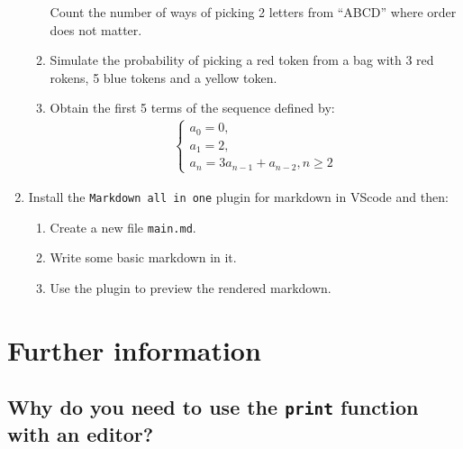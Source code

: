 \begin{enumerate}
\begin{enumerate}
Count the number of ways of picking 2 letters from ``ABCD'' where order
does not matter.

\item 

Simulate the probability of picking a red token from a bag with 3 red
rokens, 5 blue tokens and a yellow token.

\item 

Obtain the first 5 terms of the sequence defined by:
\begin{equation*}
\begin{split}
        \left\{
            \begin{array}{l}
              a_0 = 0,\\
              a_1 = 2,\\
              a_n = 3 a_{n - 1} + a_{n - 2}, n \geq 2
            \end{array}
        \right.
      \end{split}
\end{equation*}
\end{enumerate}

\item 

Install the \texttt{Markdown all in one} plugin for markdown in VScode and then:
\begin{enumerate}

\item 

Create a new file \texttt{main.md}.

\item 

Write some basic markdown in it.

\item 

Use the plugin to preview the rendered markdown.

\end{enumerate}

\end{enumerate}




\section{Further information}
\label{\detokenize{building-tools/04-editor-and-cli/why/main:further-information}}\label{\detokenize{building-tools/04-editor-and-cli/why/main::doc}}

\subsection{Why do you need to use the \texttt{print} function with an editor?}
\label{\detokenize{building-tools/04-editor-and-cli/why/main:why-do-we-need-to-use-the-print-function-with-an-editor}}

